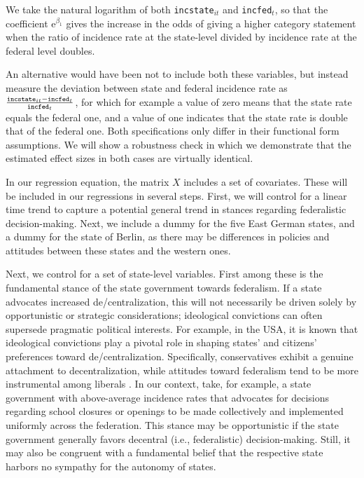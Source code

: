 \documentclass[authoryear,12pt, 3p]{elsarticle}
\theoremstyle{break}
\begin{document}
We take the natural logarithm of both \texttt{incstate}$_{it}$ and \texttt{incfed}$_{t}$, so that the coefficient $\mathrm{e}^{\beta_1}$ gives the increase in the odds of giving a higher category statement when the ratio of incidence rate at the state-level divided by incidence rate at the federal level doubles.

An alternative would have been not to include both these variables, but instead measure the deviation between state and federal incidence rate as  $\frac{\text{\texttt{incstate}}_{it} - \text{\texttt{incfed}}_{t}}{\text{\texttt{incfed}}_{t}}$, for which for example a value of zero means that the state rate equals the federal one, and a value of one indicates that the state rate is double that of the federal one. Both specifications only differ in their functional form assumptions. We will show a robustness check in which we demonstrate that the estimated effect sizes in both cases are virtually identical.

In our regression equation, the matrix $X$ includes a set of covariates. These will be included in our regressions in several steps. First, we will control for a linear time trend to capture a potential general trend in stances regarding federalistic decision-making. Next, we include a dummy for the five East German states, and a dummy for the state of Berlin, as there may be differences in policies and attitudes between these states and the western ones. 

Next, we control for a set of state-level variables. First among these is the fundamental stance of the state government towards federalism. If a state advocates increased de/centralization, this will not necessarily be driven solely by opportunistic or strategic considerations; ideological convictions can often supersede pragmatic political interests. For example, in the USA, it is known that ideological convictions play a pivotal role in shaping states' and citizens' preferences toward de/centralization. Specifically, conservatives exhibit a genuine attachment to decentralization, while attitudes toward federalism tend to be more instrumental among liberals \citep{Glaser2023, Rendleman2022}. In our context, take, for example, a state government with above-average incidence rates that advocates for decisions regarding school closures or openings to be made collectively and implemented uniformly across the federation. This stance may be opportunistic if the state government generally favors decentral (i.e., federalistic) decision-making. Still, it may also be congruent with a fundamental belief that the respective state harbors no sympathy for the autonomy of states.
\end{document}
